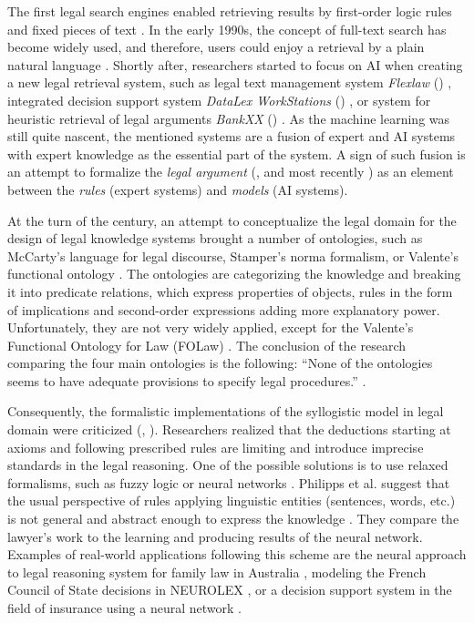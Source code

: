 \documentclass[
  digital, %
  notable,   %
  nolof,     %
  nolot,     %
]{fithesis3}
\begin{document}
The first legal search engines enabled retrieving results by first-order logic rules and fixed pieces of text \cite{Turtle1995legalRetrieval}.
In the early 1990s, the concept of full-text search has become widely used, and therefore, users could enjoy a retrieval by a plain natural language \cite{Turtle1995legalRetrieval}.
Shortly after, researchers started to focus on AI when creating a new legal retrieval system, such as legal text management system \textit{Flexlaw} (\citeyear{Smith1995flexlaw}) \cite{Smith1995flexlaw}, integrated decision support system \textit{DataLex WorkStations} (\citeyear{Greenleaf1995datalex}) \cite{Greenleaf1995datalex}, or system for heuristic retrieval of legal arguments \textit{BankXX} (\citeyear{Rissland1996bankxx}) \cite{Rissland1996bankxx}.
As the machine learning was still quite nascent, the mentioned systems are a fusion of expert and AI systems with expert knowledge as the essential part of the system.
A sign of such fusion is an attempt to formalize the \textit{legal argument} (\cite{Freeman1996argument}, \cite{Bench-Capon1997argument} and most recently \cite{ashley2013information}) as an element between the \textit{rules} (expert systems) and \textit{models} (AI systems).

At the turn of the century, an attempt to conceptualize the legal domain for the design of legal knowledge systems brought a number of ontologies, such as McCarty's language for legal discourse, Stamper's norma formalism, or Valente's functional ontology \cite{Visser1998ontologies}.
The ontologies are categorizing the knowledge and breaking it into predicate relations, which express properties of objects, rules in the form of implications and second-order expressions adding more explanatory power.
Unfortunately, they are not very widely applied, except for the Valente's Functional Ontology for Law (FOLaw) \cite{VanEngers2008folaw}.
The conclusion of the research comparing the four main ontologies is the following:
``None  of  the  ontologies  seems  to  have  adequate  provisions  to  specify  legal procedures.'' \cite{Visser1998ontologies}.

Consequently, the formalistic implementations of the syllogistic model in legal domain were criticized (\cite{Shapira1999fuzzy}, \cite{Philipps1999nn}).
Researchers realized that the deductions starting at axioms and following prescribed rules are limiting and introduce imprecise standards in the legal reasoning.
One of the possible solutions is to use relaxed formalisms, such as fuzzy logic \cite{Shapira1999fuzzy} or neural networks \cite{Philipps1999nn}.
Philipps et al. suggest that the usual perspective of rules applying linguistic entities (sentences, words, etc.) is not general and abstract enough to express the knowledge \cite{Philipps1999nn}.
They compare the lawyer's work to the learning and producing results of the neural network.
Examples of real-world applications following this scheme are the neural approach to legal reasoning system for family law in Australia \cite{Stranieri1999nn}, modeling the French Council of State decisions in NEUROLEX \cite{Bourcier1999nn}, or a decision support system in the field of insurance using a neural network \cite{Borgulya1999nn}.
\end{document}
